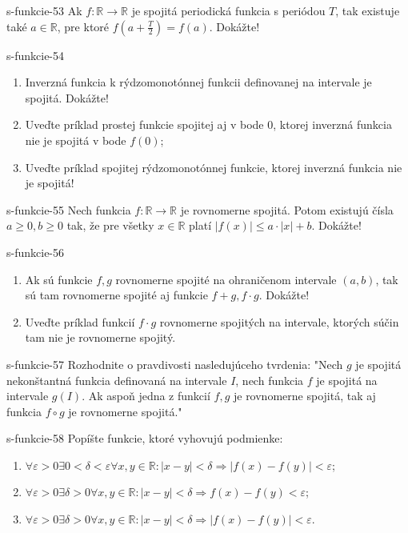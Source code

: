 \begin{defproblem}{s-funkcie-53}
Ak $f: \mathbb{R} \rightarrow \mathbb{R}$ je spojitá periodická funkcia s periódou $T$, tak existuje také $a \in \mathbb{R}$, pre ktoré $f(a+\frac{T}{2})=f(a)$. Dokážte!
\end{defproblem}

\begin{defproblem}{s-funkcie-54}
  \begin{enumerate}
    \item
      Inverzná funkcia k rýdzomonotónnej funkcii definovanej na intervale je
      spojitá. Dokážte!
    \item
      Uveďte príklad prostej funkcie spojitej aj v bode $0$, ktorej inverzná
      funkcia nie je spojitá v bode $f(0)$;
    \item
      Uveďte príklad spojitej rýdzomonotónnej funkcie, ktorej inverzná funkcia
      nie je spojitá!
  \end{enumerate}
\end{defproblem}

\begin{defproblem}{s-funkcie-55}
Nech funkcia $f: \mathbb{R} \rightarrow \mathbb{R}$ je rovnomerne spojitá. Potom existujú čísla $a \geq 0,b \geq 0$ tak, že pre všetky $x \in \mathbb{R}$ platí $|f(x)| \leq a \cdot |x|+b$. Dokážte!
\end{defproblem}

\begin{defproblem}{s-funkcie-56}
\begin{enumerate}
\item Ak sú funkcie $f,g$ rovnomerne spojité na ohraničenom intervale $(a,b)$, tak sú tam rovnomerne spojité aj funkcie $f+g,f \cdot g$. Dokážte!
\item Uveďte príklad funkcií $f \cdot g$ rovnomerne spojitých na intervale, ktorých súčin tam nie je rovnomerne spojitý.
\end{enumerate}
\end{defproblem}

\begin{defproblem}{s-funkcie-57}
Rozhodnite o pravdivosti nasledujúceho tvrdenia: "Nech $g$ je spojitá nekonštantná funkcia definovaná na intervale $I$, nech funkcia $f$ je spojitá na intervale $g(I)$. Ak aspoň jedna z funkcií $f,g$ je rovnomerne spojitá, tak aj funkcia $f \circ g$ je rovnomerne spojitá."
\end{defproblem}

\begin{defproblem}{s-funkcie-58}
Popíšte funkcie, ktoré vyhovujú podmienke:
\begin{enumerate}
\item $\forall \varepsilon >0 \exists 0<\delta<\varepsilon \forall x,y \in \mathbb{R}:|x-y|<\delta \Rightarrow |f(x)-f(y)|<\varepsilon$;
\item $\forall \varepsilon >0 \exists \delta>0 \forall x,y \in \mathbb{R}:|x-y|<\delta \Rightarrow f(x)-f(y)<\varepsilon$;
\item $\forall \varepsilon >0 \exists \delta>0 \forall x,y \in \mathbb{R}:|x-y|<\delta \Rightarrow |f(x)-f(y)|<\varepsilon$.
\end{enumerate}
\end{defproblem}